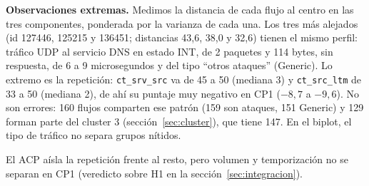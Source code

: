 \textbf{Observaciones extremas.} Medimos la distancia de cada flujo al centro en las tres componentes, ponderada por la varianza de cada una. Los tres más alejados (id 127446, 125215 y 136451; distancias 43,6, 38,0 y 32,6) tienen el mismo perfil: tráfico UDP al servicio DNS en estado INT, de 2 paquetes y 114 bytes, sin respuesta, de 6 a 9 microsegundos y del tipo ``otros ataques'' (Generic). Lo extremo es la repetición: \texttt{ct\_srv\_src} va de 45 a 50 (mediana 3) y \texttt{ct\_src\_ltm} de 33 a 50 (mediana 2), de ahí su puntaje muy negativo en CP1 ($-8,7$ a $-9,6$). No son errores: 160 flujos comparten ese patrón (159 son ataques, 151 Generic) y 129 forman parte del cluster 3 (sección~\ref{sec:cluster}), que tiene 147. En el biplot, el tipo de tráfico no separa grupos nítidos.

El ACP aísla la repetición frente al resto, pero volumen y temporización no se separan en CP1 (veredicto sobre H1 en la sección~\ref{sec:integracion}).
